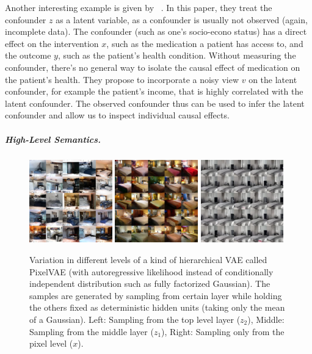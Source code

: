 \documentclass{article}
\begin{document}
Another interesting example is given by ~\citet{louizos2017causal}.
In this paper, they treat the confounder $z$ as a latent variable, as a confounder is usually not observed (again, incomplete data). 
The confounder (such as one's socio-econo status) has a direct effect on the intervention $x$, such as the medication a patient has access to, and the outcome $y$, such as the patient's health condition.
Without measuring the confounder, there's no general way to isolate the causal effect of medication on the patient's health. 
They propose to incorporate a noisy view $v$ on the latent confounder, for example the patient's income, that is highly correlated with the latent confounder.
The observed confounder thus can be used to infer the latent confounder and allow us to inspect individual causal effects.

\subparagraph{High-Level Semantics.}
\begin{figure}
\includegraphics[width=0.32\textwidth]{figures/pixelvae_z2.png}
\includegraphics[width=0.32\textwidth]{figures/pixelvae_z1.jpg}
\includegraphics[width=0.32\textwidth]{figures/pixelvae_x.jpg}
\label{ref:pixelvae_difflayers}
\caption{Variation in different levels of a kind of hierarchical VAE called PixelVAE \cite{gulrajani2016pixelvae} (with autoregressive likelihood instead of conditionally independent distribution such as fully factorized Gaussian). The samples are generated by sampling from certain layer while holding the others fixed as deterministic hidden units (taking only the mean of a Gaussian). Left: {Sampling from the top level layer ($z_2$)}, Middle: {Sampling from the middle layer ($z_1$)}, Right: {Sampling only from the pixel level ($x$)}.}
\end{figure}
\end{document}
